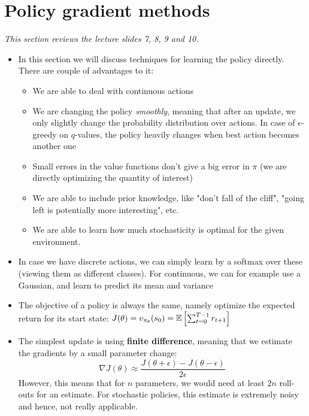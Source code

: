 \section{Policy gradient methods}
\label{sec:policy_learning}
\textit{This section reviews the lecture slides 7, 8, 9 and 10.}
\begin{itemize}
	\item In this section we will discuss techniques for learning the policy directly. There are couple of advantages to it:
	\begin{itemize}
		\item We are able to deal with continuous actions
		\item We are changing the policy \textit{smoothly}, meaning that after an update, we only slightly change the probability distribution over actions. In case of $\epsilon$-greedy on $q$-values, the policy heavily changes when best action becomes another one
		\item Small errors in the value functions don't give a big error in $\pi$ (we are directly optimizing the quantity of interest)
		\item We are able to include prior knowledge, like "don't fall of the cliff", "going left is potentially more interesting", etc.
		\item We are able to learn how much stochasticity is optimal for the given environment. 
	\end{itemize}
	\item In case we have discrete actions, we can simply learn by a softmax over these (viewing them as different classes). For continuous, we can for example use a Gaussian, and learn to predict its mean and variance
	\item The objective of a policy is always the same, namely optimize the expected return for its start state: $J(\theta)=v_{\pi_{\theta}}(s_0)=\mathbb{E}\left[\sum_{t=0}^{T-1} r_{t+1}\right]$
	\item The simplest update is using \textbf{finite difference}, meaning that we estimate the gradients by a small parameter change:
	$$\nabla J(\theta)\approx \frac{ J(\theta+\epsilon) - J(\theta-\epsilon)}{2\epsilon}$$
	However, this means that for $n$ parameters, we would need at least $2n$ roll-outs for an estimate. For stochastic policies, this estimate is extremely noisy and hence, not really applicable.
\end{itemize}
